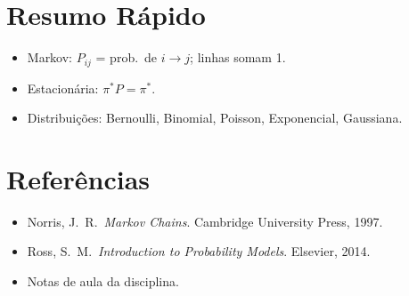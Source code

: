 \documentclass[12pt,a4paper]{article}
\begin{document}
\section*{Resumo R\'apido}
\begin{itemize}
  \item Markov: $P_{ij}$ = prob.\ de $i \to j$; linhas somam 1.
  \item Estacion\'aria: $\pi^* P = \pi^*$.
  \item Distribui\c{c}\~oes: Bernoulli, Binomial, Poisson, Exponencial, Gaussiana.
\end{itemize}

\section*{Refer\^encias}
\begin{itemize}
  \item Norris, J.\ R.\ \textit{Markov Chains}. Cambridge University Press, 1997.
  \item Ross, S.\ M.\ \textit{Introduction to Probability Models}. Elsevier, 2014.
  \item Notas de aula da disciplina.
\end{itemize}
\end{document}
